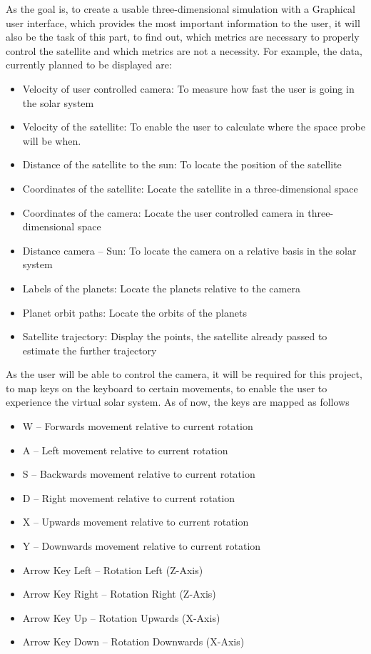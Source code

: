 \documentclass[conference,compsoc]{IEEEtran}
\begin{document}
As the goal is, to create a usable three-dimensional simulation with a Graphical user interface, which provides the most important information to the user, it will also be the task of this part, to find out, which metrics are necessary to properly control the satellite and which metrics are not a necessity. For example, the data, currently planned to be displayed are: 
\begin{itemize}
	\item Velocity of user controlled camera: To measure how fast the user is going in the solar system
	\item Velocity of the satellite: To enable the user to calculate where the space probe will be when.
	\item Distance of the satellite to the sun: To locate the position of the satellite
	\item Coordinates of the satellite: Locate the satellite in a three-dimensional space
	\item Coordinates of the camera: Locate the user controlled camera in three-dimensional space
	\item Distance camera – Sun: To locate the camera on a relative basis in the solar system
	\item Labels of the planets: Locate the planets relative to the camera
	\item Planet orbit paths: Locate the orbits of the planets
	\item Satellite trajectory: Display the points, the satellite already passed to estimate the further trajectory
\end{itemize}

As the user will be able to control the camera, it will be required for this project, to map keys on the keyboard to certain movements, to enable the user to experience the virtual solar system. As of now, the keys are mapped as follows
\begin{itemize}
	\item W – Forwards movement relative to current rotation
	\item A – Left movement relative to current rotation
	\item S – Backwards movement relative to current rotation
	\item D – Right movement relative to current rotation
	\item X – Upwards movement relative to current rotation
	\item Y – Downwards movement relative to current rotation
	\item Arrow Key Left – Rotation Left (Z-Axis)
	\item Arrow Key Right – Rotation Right (Z-Axis)
	\item Arrow Key Up – Rotation Upwards (X-Axis)
	\item Arrow Key Down – Rotation Downwards (X-Axis)
\end{itemize}
\end{document}
